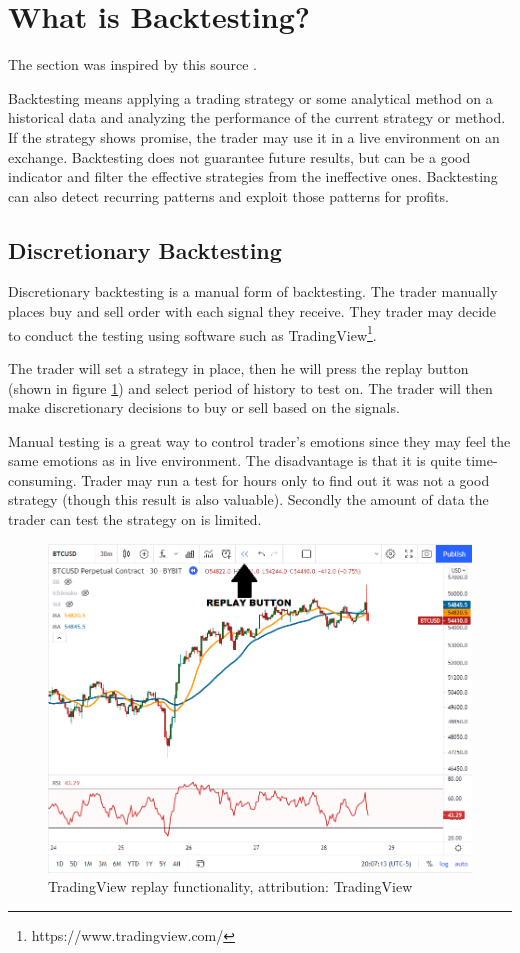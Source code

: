 \section{What is Backtesting?}
The section was inspired by this source \cite{backtesting-crypto-trading-strategies}. 

Backtesting means applying a trading strategy or some analytical method on a historical data and analyzing the performance of the current strategy or method. If the strategy shows promise, the trader may use it in a live environment on an exchange. Backtesting does not guarantee future results, but can be a good indicator and filter the effective strategies from the ineffective ones. Backtesting can also detect recurring patterns and exploit those patterns for profits.

\subsection*{Discretionary Backtesting}
Discretionary backtesting is a manual form of backtesting. The trader manually places buy and sell order with each signal they receive. They trader may decide to conduct the testing using software such as TradingView\footnote{https://www.tradingview.com/}.

The trader will set a strategy in place, then he will press the replay button (shown in figure \ref{tradingview-figure}) and select period of history to test on. The trader will then make discretionary decisions to buy or sell based on the signals.

Manual testing is a great way to control trader's emotions since they may feel the same emotions as in live environment. The disadvantage is that it is quite time-consuming. Trader may run a test for hours only to find out it was not a good strategy (though this result is also valuable). Secondly the amount of data the trader can test the strategy on is limited.

\begin{figure}[ht]
    \centering
    \includegraphics[width=\columnwidth]{figures/tradingview-replay.png}
    \caption{TradingView replay functionality, attribution: TradingView \cite{backtesting-crypto-trading-strategies}}
    \label{tradingview-figure}
\end{figure}

